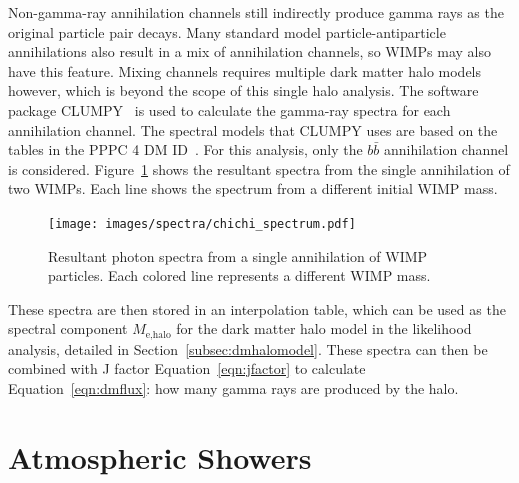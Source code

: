     Non-gamma-ray annihilation channels still indirectly produce gamma rays as the original particle pair decays.
    Many standard model particle-antiparticle annihilations also result in a mix of annihilation channels, so WIMPs may also have this feature.
    Mixing channels requires multiple dark matter halo models however, which is beyond the scope of this single halo analysis.
    The software package CLUMPY~\cite{CLUMPYcode} is used to calculate the gamma-ray spectra for each annihilation channel.
    The spectral models that CLUMPY uses are based on the tables in the PPPC 4 DM ID~\cite{pppc4_dm_spectra}.
    For this analysis, only the $b\bar{b}$ annihilation channel is considered.
    Figure~\ref{fig:chichi_spectrum} shows the resultant spectra from the single annihilation of two WIMPs.
    Each line shows the spectrum from a different initial WIMP mass.

    \begin{figure}[ht]
      \centering
      \texttt{[image: images/spectra/chichi\_spectrum.pdf]}
      \caption[Single Annihilation Spectra]{
        Resultant photon spectra from a single annihilation of WIMP particles.
        Each colored line represents a different WIMP mass.}
      \label{fig:chichi_spectrum}
    \end{figure}

    These spectra are then stored in an interpolation table, which can be used as the spectral component $M_{\textrm{e,halo}}$ for the dark matter halo model in the likelihood analysis, detailed in Section~\ref{subsec:dmhalomodel}.
    These spectra can then be combined with J factor Equation~\ref{eqn:jfactor} to calculate Equation~\ref{eqn:dmflux}: how many gamma rays are produced by the halo.

    \FloatBarrier
    
    
\section{Atmospheric Showers}

